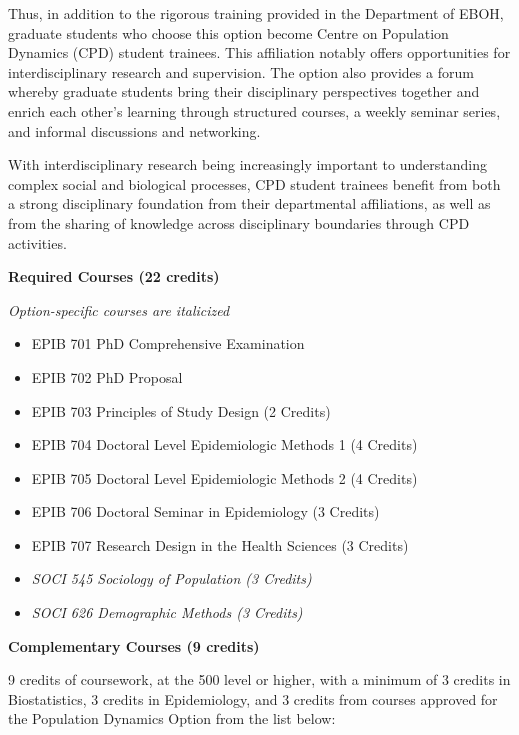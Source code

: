 \documentclass[
  openany]{book}
\providecommand{\tightlist}{%
  \setlength{\itemsep}{0pt}\setlength{\parskip}{0pt}}
\begin{document}
Thus, in addition to the rigorous training provided in the Department of EBOH, graduate students who choose this option become Centre on Population Dynamics (CPD) student trainees. This affiliation notably offers opportunities for interdisciplinary research and supervision. The option also provides a forum whereby graduate students bring their disciplinary perspectives together and enrich each other's learning through structured courses, a weekly seminar series, and informal discussions and networking.

With interdisciplinary research being increasingly important to understanding complex social and biological processes, CPD student trainees benefit from both a strong disciplinary foundation from their departmental affiliations, as well as from the sharing of knowledge across disciplinary boundaries through CPD activities.

\textbf{Required Courses (22 credits)}

\emph{Option-specific courses are italicized}

\begin{itemize}
\tightlist
\item
  EPIB 701 PhD Comprehensive Examination
\item
  EPIB 702 PhD Proposal
\item
  EPIB 703 Principles of Study Design (2 Credits)
\item
  EPIB 704 Doctoral Level Epidemiologic Methods 1 (4 Credits)
\item
  EPIB 705 Doctoral Level Epidemiologic Methods 2 (4 Credits)
\item
  EPIB 706 Doctoral Seminar in Epidemiology (3 Credits)
\item
  EPIB 707 Research Design in the Health Sciences (3 Credits)
\item
  \emph{SOCI 545 Sociology of Population (3 Credits)}
\item
  \emph{SOCI 626 Demographic Methods (3 Credits)}
\end{itemize}

\textbf{Complementary Courses (9 credits)}

9 credits of coursework, at the 500 level or higher, with a minimum of 3 credits in Biostatistics, 3 credits in Epidemiology, and 3 credits from courses approved for the Population Dynamics Option from the list below:
\end{document}
